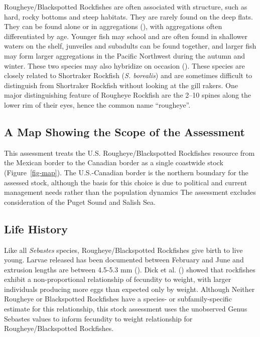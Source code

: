 \documentclass[
]{scrartcl}
\begin{document}
Rougheye/Blackspotted Rockfishes are often associated with structure,
such as hard, rocky bottoms and steep habitats. They are rarely found on
the deep flats. They can be found alone or in aggregations
(), with aggregations often differentiated by age. Younger fish may
school and are often found in shallower waters on the shelf, junveiles
and subadults can be found together, and larger fish may form larger
aggregations in the Pacific Northwest during the autumn and winter.
These two species may also hybridize on occasion
(). These species are
closely related to Shortraker Rockfish (\emph{S. borealis}) and are
sometimes difficult to distinguish from Shortraker Rockfish without
looking at the gill rakers. One major distinguishing feature of Rougheye
Rockfish are the 2--10 spines along the lower rim of their eyes, hence
the common name ``rougheye''.

\subsection{A Map Showing the Scope of the
Assessment}\label{a-map-showing-the-scope-of-the-assessment}

This assessment treats the U.S. Rougheye/Blackspotted Rockfishes
resource from the Mexican border to the Canadian border as a single
coastwide stock (Figure~\ref{fig-map}). The U.S.-Canadian border is the
northern boundary for the assessed stock, although the basis for this
choice is due to political and current management needs rather than the
population dynamics The assessment excludes consideration of the Puget
Sound and Salish Sea.

\subsection{Life History}\label{life-history}

Like all \emph{Sebastes} species, Rougheye/Blackspotted Rockfishes give
birth to live young. Larvae released has been documented between
February and June and extrusion lengths are between 4.5-5.3 mm
(). Dick et al. ()
showed that rockfishes exhibit a non-proportional relationship of
fecundity to weight, with larger individuals producing more eggs than
expected only by weight. Although Neither Rougheye or Blackspotted
Rockfishes have a species- or subfamily-specific estimate for this
relationship, this stock assessment uses the unobserved Genus Sebastes
values to inform fecundity to weight relationship for
Rougheye/Blackspotted Rockfishes.
\end{document}
